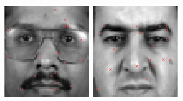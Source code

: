 \begin{figure}
\begin{center}
\includegraphics[width=\textwidth/9]{ch4/figures/NoC3.png}
\includegraphics[width=\textwidth/9]{ch4/figures/NoC4.png}

\end{center}
\end{figure}
